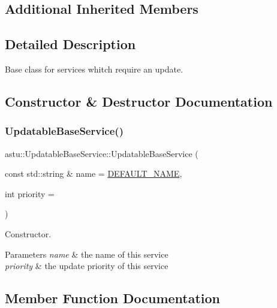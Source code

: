 \subsection*{Additional Inherited Members}


\subsection{Detailed Description}
Base class for services whitch require an update. 

\subsection{Constructor \& Destructor Documentation}
\mbox{\label{classastu_1_1UpdatableBaseService_affb07c2699a08b42eb5b8ca96ed681c0}} 
\subsubsection{\texorpdfstring{Updatable\+Base\+Service()}{UpdatableBaseService()}}
{\footnotesize\ttfamily astu\+::\+Updatable\+Base\+Service\+::\+Updatable\+Base\+Service (\begin{DoxyParamCaption}\item[{const std\+::string \&}]{name = {\ttfamily \hyperlink{classastu_1_1BaseService_a9483b26ad631bd14646ef2d2170cd828}{D\+E\+F\+A\+U\+L\+T\+\_\+\+N\+A\+ME}},  }\item[{int}]{priority = {} }\end{DoxyParamCaption})}

Constructor.


\begin{DoxyParams}{Parameters}
{\em name} & the name of this service \\
\hline
{\em priority} & the update priority of this service \\
\hline
\end{DoxyParams}


\subsection{Member Function Documentation}
\mbox{\label{classastu_1_1UpdatableBaseService_a22a9824510d94fa97efb962ae38be945}} 
